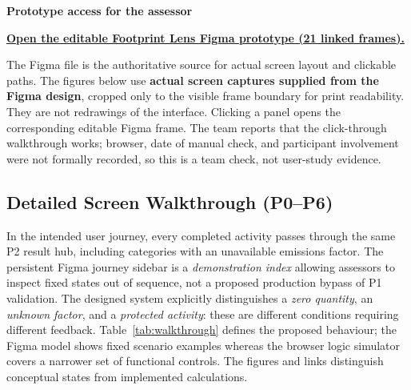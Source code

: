 \documentclass[12pt,a4paper]{article}
\begin{document}
\begin{keybox}
\textbf{\sffamily\color{Navy}Prototype access for the assessor}\par
\href{https://www.figma.com/design/L1kEH28shvU8494m2Y7EnT}{\sffamily\bfseries\color{Teal}Open the editable Footprint Lens Figma prototype (21 linked frames).}\par
The Figma file is the authoritative source for actual screen layout and clickable paths. The figures below use \textbf{actual screen captures supplied from the Figma design}, cropped only to the visible frame boundary for print readability. They are not redrawings of the interface. Clicking a panel opens the corresponding editable Figma frame. The team reports that the click-through walkthrough works; browser, date of manual check, and participant involvement were not formally recorded, so this is a team check, not user-study evidence.
\end{keybox}

\subsection{Detailed Screen Walkthrough (P0--P6)}
In the intended user journey, every completed activity passes through the same P2 result hub, including categories with an unavailable emissions factor. The persistent Figma journey sidebar is a \emph{demonstration index} allowing assessors to inspect fixed states out of sequence, not a proposed production bypass of P1 validation. The designed system explicitly distinguishes a \emph{zero quantity}, an \emph{unknown factor}, and a \emph{protected activity}: these are different conditions requiring different feedback. Table~\ref{tab:walkthrough} defines the proposed behaviour; the Figma model shows fixed scenario examples whereas the browser logic simulator covers a narrower set of functional controls. The figures and links distinguish conceptual states from implemented calculations.
\end{document}
